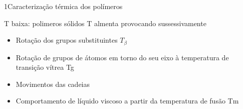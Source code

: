 \documentclass[\mainfilename]{subfiles}
\begin{document}
\begin{sectionBox}1{Caracterização térmica dos polímeros} %
    
    T baixa: polimeros sólidos
    T almenta provocando sussessivamente
    \begin{itemize}
        \item Rotação dos grupos substituintes \(T_{\beta}\)
        \item Rotação de grupos de átomos em torno do seu eixo à temperatura de transição vítrea Tg
        \item Movimentos das cadeias
        \item Comportamento de líquido viscoso a partir da temperatura de fusão Tm
    \end{itemize}
    
\end{sectionBox}
\end{document}
